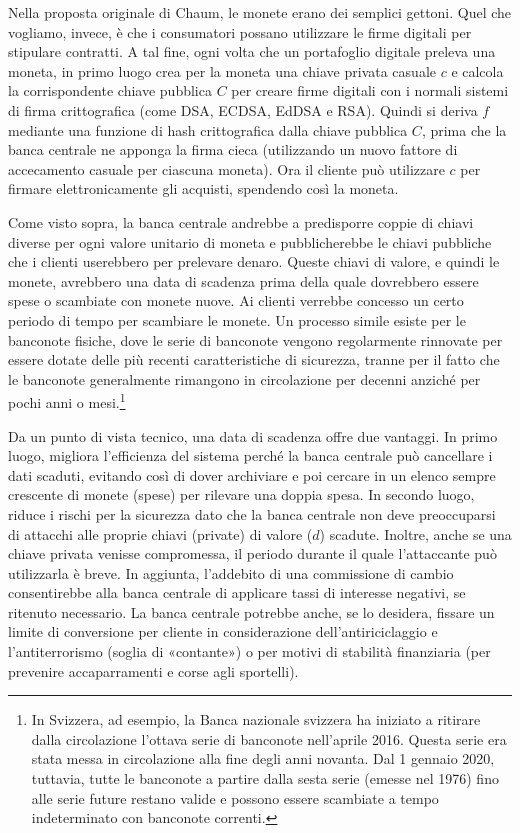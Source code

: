 \documentclass{article}
\begin{document}
Nella proposta originale di Chaum, le monete erano dei semplici 
gettoni. Quel che vogliamo, invece, è che i consumatori possano 
utilizzare le firme digitali per stipulare contratti. A tal fine, ogni 
volta che un portafoglio digitale preleva una moneta, in primo luogo 
crea per la moneta una chiave privata casuale $c$ e calcola la 
corrispondente chiave pubblica $C$ per creare firme digitali con i 
normali sistemi di firma crittografica (come DSA, ECDSA, EdDSA e 
RSA). Quindi si deriva $f$ mediante una funzione di hash crittografica 
dalla chiave pubblica $C$, prima che la banca centrale ne apponga la 
firma cieca (utilizzando un nuovo fattore di accecamento casuale per 
ciascuna moneta). Ora il cliente può utilizzare $c$ per firmare 
elettronicamente gli acquisti, spendendo così la moneta.

Come visto sopra, la banca centrale andrebbe a predisporre coppie di 
chiavi diverse per ogni valore unitario di moneta e pubblicherebbe le 
chiavi pubbliche che i clienti userebbero per prelevare denaro. Queste 
chiavi di valore, e quindi le monete, avrebbero una data di scadenza 
prima della quale dovrebbero essere spese o scambiate con monete 
nuove. Ai clienti verrebbe concesso un certo periodo di tempo per 
scambiare le monete. Un processo simile esiste per le banconote 
fisiche, dove le serie di banconote vengono regolarmente rinnovate per 
essere dotate delle più recenti caratteristiche di sicurezza, tranne 
per il fatto che le banconote generalmente rimangono in circolazione 
per decenni anziché per pochi anni o mesi.\footnote{In Svizzera, 
ad esempio, la Banca nazionale svizzera ha iniziato a ritirare dalla 
circolazione l'ottava serie di banconote nell'aprile 2016. Questa serie 
era stata messa in circolazione alla fine degli anni novanta. Dal 1 
gennaio 2020, tuttavia, tutte le banconote a partire dalla sesta serie 
(emesse nel 1976) fino alle serie future restano valide e possono essere 
scambiate a tempo indeterminato con banconote correnti.}

Da un punto di vista tecnico, una data di scadenza offre due vantaggi. 
In primo luogo, migliora l'efficienza del sistema perché la banca 
centrale può cancellare i dati scaduti, evitando così di dover 
archiviare e poi cercare in un elenco sempre crescente di monete 
(spese) per rilevare una doppia spesa. In secondo luogo, riduce i 
rischi per la sicurezza dato che la banca centrale non deve 
preoccuparsi di attacchi alle proprie chiavi (private) di valore ($d$) 
scadute. Inoltre, anche se una chiave privata venisse compromessa, il 
periodo durante il quale l'attaccante può utilizzarla è breve. In aggiunta, 
l'addebito di una commissione di cambio consentirebbe alla banca centrale di 
applicare tassi di interesse negativi, se ritenuto necessario. La banca centrale 
potrebbe anche, se lo desidera, fissare un limite di conversione per cliente in 
considerazione dell'antiriciclaggio e l'antiterrorismo (soglia di «contante») o 
per motivi di stabilità finanziaria (per prevenire accaparramenti e corse agli 
sportelli).
\end{document}
